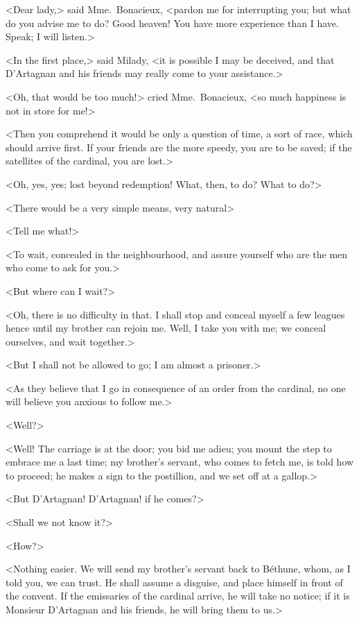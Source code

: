 <Dear lady,> said Mme.~Bonacieux, <pardon me for interrupting you; but what do you advise me to do? Good heaven! You have more experience than I have. Speak; I will listen.> 

<In the first place,> said Milady, <it is possible I may be deceived, and that D'Artagnan and his friends may really come to your assistance.> 

<Oh, that would be too much!> cried Mme.~Bonacieux, <so much happiness is not in store for me!> 

<Then you comprehend it would be only a question of time, a sort of race, which should arrive first. If your friends are the more speedy, you are to be saved; if the satellites of the cardinal, you are lost.> 

<Oh, yes, yes; lost beyond redemption! What, then, to do? What to do?> 

<There would be a very simple means, very natural\longdash> 

<Tell me what!> 

<To wait, concealed in the neighbourhood, and assure yourself who are the men who come to ask for you.> 

<But where can I wait?> 

<Oh, there is no difficulty in that. I shall stop and conceal myself a few leagues hence until my brother can rejoin me. Well, I take you with me; we conceal ourselves, and wait together.> 

<But I shall not be allowed to go; I am almost a prisoner.> 

<As they believe that I go in consequence of an order from the cardinal, no one will believe you anxious to follow me.> 

<Well?> 

<Well! The carriage is at the door; you bid me adieu; you mount the step to embrace me a last time; my brother's servant, who comes to fetch me, is told how to proceed; he makes a sign to the postillion, and we set off at a gallop.> 

<But D'Artagnan! D'Artagnan! if he comes?> 

<Shall we not know it?> 

<How?> 

<Nothing easier. We will send my brother's servant back to Béthune, whom, as I told you, we can trust. He shall assume a disguise, and place himself in front of the convent. If the emissaries of the cardinal arrive, he will take no notice; if it is Monsieur D'Artagnan and his friends, he will bring them to us.> 

